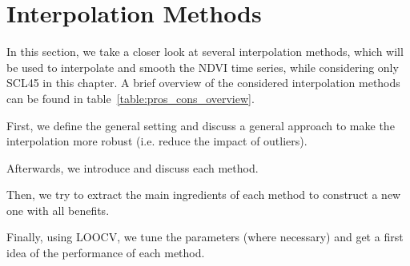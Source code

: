 \newcommand{\RobItPlot}{fitted to different (SCL45) NDVI time series. Iterations of a robustifing refit (as indicated in section~\ref{sec:loess_robustify}) are also displayed}


\chapter{Interpolation Methods} \label{sec:itpl}
	{%
		In this section, we take a closer look at several interpolation methods, which will be used to interpolate and smooth the NDVI time series, while considering only SCL45 in this chapter. 
		A brief overview of the considered interpolation methods can be found in table~\ref{table:pros_cons_overview}.

		First, we define the general setting and discuss a general approach to make the interpolation more robust (i.e. reduce the impact of outliers).

		Afterwards, we introduce and discuss each method.

		Then, we try to extract the main ingredients of each method to construct a new one with all benefits.

		Finally, using LOOCV, we tune the parameters (where necessary) and get a first idea of the performance of each method.
	}
	{%
		\footnotesize
		
		\normalsize
	}

